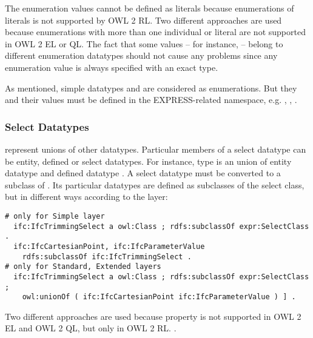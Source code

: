 The enumeration values cannot be defined as literals because enumerations of literals is not supported by OWL 2 RL. Two different approaches are used because enumerations with more than one individual or literal are not supported in OWL 2 EL or QL. The fact that some values -- for instance,  -- belong to different enumeration data\-types should not cause any problems since any enumeration value is always specified with an exact type. 


As mentioned, simple data\-types  and  are considered as enumerations. But they and their values must be defined in the EXPRESS-related namespace, e.g. , , .



\subsubsection{Select Datatypes} represent unions of other data\-types. Particular members of a select data\-type can be entity, defined or select data\-types. For instance, type  is an union of entity data\-type  and defined data\-type . A select data\-type must be converted to a subclass of . Its particular data\-types are defined as subclasses of the select class, but in different ways according to the layer:

\begin{lstlisting}
# only for Simple layer
  ifc:IfcTrimmingSelect a owl:Class ; rdfs:subclassOf expr:SelectClass .
  ifc:IfcCartesianPoint, ifc:IfcParameterValue
    rdfs:subclassOf ifc:IfcTrimmingSelect .
# only for Standard, Extended layers
  ifc:IfcTrimmingSelect a owl:Class ; rdfs:subclassOf expr:SelectClass ;
    owl:unionOf ( ifc:IfcCartesianPoint ifc:IfcParameterValue ) ] .
\end{lstlisting}

Two different approaches are used because property  is not supported in OWL 2 EL and OWL 2 QL, but only in OWL 2 RL. \cite{motik2013owl}.




